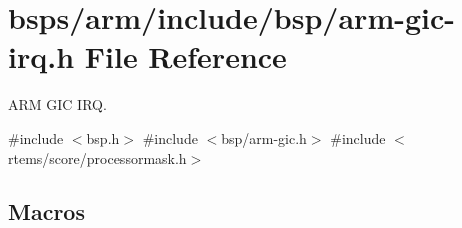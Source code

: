 \hypertarget{arm-gic-irq_8h}{}\section{bsps/arm/include/bsp/arm-\/gic-\/irq.h File Reference}
\label{arm-gic-irq_8h}


A\+RM G\+IC I\+RQ.  


{\ttfamily \#include $<$bsp.\+h$>$}\newline
{\ttfamily \#include $<$bsp/arm-\/gic.\+h$>$}\newline
{\ttfamily \#include $<$rtems/score/processormask.\+h$>$}\newline
\subsection*{Macros}
